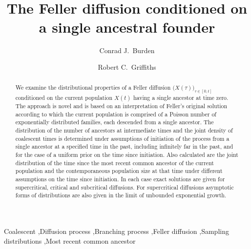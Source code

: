 \documentclass[preprint,12pt]{elsarticle}
\begin{document}

\begin{frontmatter}

\title{The Feller diffusion conditioned on a single ancestral founder}
\author[label1]{Conrad J.\ Burden}
\author[label2]{Robert C.\ Griffiths}
\address[label1]{Mathematical Sciences Institute, Australian National University, Canberra, Australia}
\address[label2]{School of Mathematics, Monash University, Australia}


\begin{abstract}
We examine the distributional properties of a Feller diffusion $\big(X(\tau)\big)_{\tau \in [0, t]}$ conditioned on the current population $X(t)$  
having a single ancestor at time zero.  The approach is novel and is based on an interpretation of Feller's original solution according to which the
current population is comprised of a Poisson number of exponentially distributed families, each descended from a single ancestor.  The distribution of 
the number of ancestors at intermediate times and the joint density of coalescent times is determined under assumptions of initiation of the process 
from a single ancestor 
at a specified time in the past, including infinitely far in the past, and for the case of a uniform prior on the time since initiation.  Also calculated are 
the joint distribution of the time since the most recent common ancestor of the current population and the contemporaneous population size at that 
time under different assumptions on the time since initiation.  In each case exact solutions are given for supercritical, critical and subcritical 
diffusions.  For supercritical diffusions asymptotic forms of distributions are also given in the limit of unbounded exponential growth.  
\end{abstract}

\begin{keyword}
Coalescent \sep Diffusion process \sep Branching process \sep Feller diffusion \sep Sampling distributions \sep Most recent common ancestor
\end{keyword}
\end{frontmatter}

%
\end{document}
